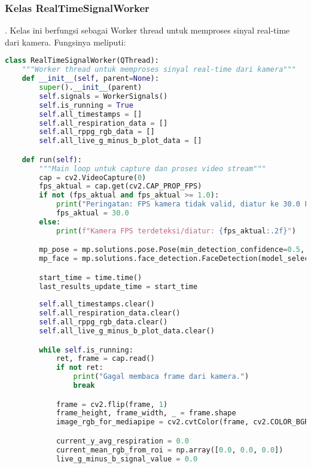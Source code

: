 \documentclass[11pt,a4paper]{article}
\begin{document}
\subsubsection{Kelas RealTimeSignalWorker}.
     Kelas ini berfungsi sebagai Worker thread untuk memproses sinyal real-time dari kamera. Fungsinya meliputi:
    \begin{lstlisting}[language=Python, caption=Kelas RealTimeSignalWorker,label={labelkode}]
    class RealTimeSignalWorker(QThread):
    """Worker thread untuk memproses sinyal real-time dari kamera"""
    def __init__(self, parent=None):
        super().__init__(parent)
        self.signals = WorkerSignals()
        self.is_running = True
        self.all_timestamps = []
        self.all_respiration_data = [] 
        self.all_rppg_rgb_data = []    
        self.all_live_g_minus_b_plot_data = []

    def run(self):
        """Main loop untuk capture dan proses video stream"""
        cap = cv2.VideoCapture(0)
        fps_aktual = cap.get(cv2.CAP_PROP_FPS)
        if not (fps_aktual and fps_aktual >= 1.0):
            print("Peringatan: FPS kamera tidak valid, diatur ke 30.0 FPS")
            fps_aktual = 30.0 
        else:
            print(f"Kamera FPS terdeteksi/diatur: {fps_aktual:.2f}")

        mp_pose = mp.solutions.pose.Pose(min_detection_confidence=0.5, min_tracking_confidence=0.5)
        mp_face = mp.solutions.face_detection.FaceDetection(model_selection=0, min_detection_confidence=0.5)

        start_time = time.time()
        last_results_update_time = start_time
        
        self.all_timestamps.clear()
        self.all_respiration_data.clear()
        self.all_rppg_rgb_data.clear()
        self.all_live_g_minus_b_plot_data.clear()

        while self.is_running:
            ret, frame = cap.read()
            if not ret:
                print("Gagal membaca frame dari kamera.")
                break

            frame = cv2.flip(frame, 1) 
            frame_height, frame_width, _ = frame.shape
            image_rgb_for_mediapipe = cv2.cvtColor(frame, cv2.COLOR_BGR2RGB)

            current_y_avg_respiration = 0.0
            current_mean_rgb_from_roi = np.array([0.0, 0.0, 0.0]) 
            live_g_minus_b_signal_value = 0.0 


\end{lstlisting}
\end{document}

